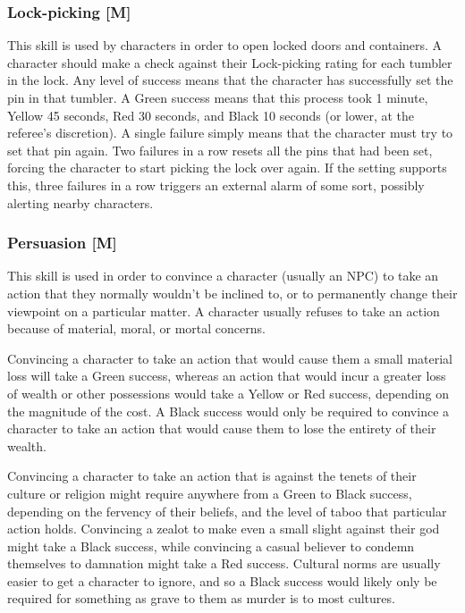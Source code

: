 \documentclass[oneside]{book}
\begin{document}
\begin{multicols}{2}
\subsubsection{Lock-picking [M]}
This skill is used by characters in order to open locked doors and containers. A character should make a check against their Lock-picking rating for each tumbler in the lock. Any level of success means that the character has successfully set the pin in that tumbler. A Green success means that this process took 1 minute, Yellow 45 seconds, Red 30 seconds, and Black 10 seconds (or lower, at the referee's discretion). A single failure simply means that the character must try to set that pin again. Two failures in a row resets all the pins that had been set, forcing the character to start picking the lock over again. If the setting supports this, three failures in a row triggers an external alarm of some sort, possibly alerting nearby characters.

\subsubsection{Persuasion [M]}
This skill is used in order to convince a character (usually an NPC) to take an action that they normally wouldn't be inclined to, or to permanently change their viewpoint on a particular matter. A character usually refuses to take an action because of material, moral, or mortal concerns. 

Convincing a character to take an action that would cause them a small material loss will take a Green success, whereas an action that would incur a greater loss of wealth or other possessions would take a Yellow or Red success, depending on the magnitude of the cost. A Black success would only be required to convince a character to take an action that would cause them to lose the entirety of their wealth. 

Convincing a character to take an action that is against the tenets of their culture or religion might require anywhere from a Green to Black success, depending on the fervency of their beliefs, and the level of taboo that particular action holds. Convincing a zealot to make even a small slight against their god might take a Black success, while convincing a casual believer to condemn themselves to damnation might take a Red success. Cultural norms are usually easier to get a character to ignore, and so a Black success would likely only be required for something as grave to them as murder is to most cultures.


\end{multicols}
\end{document}
